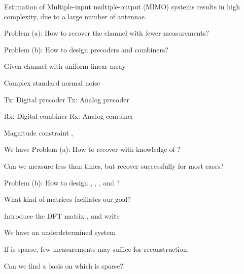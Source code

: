 {
\blank [big]

\I Estimation of Multiple-input multiple-output (MIMO) systems results in high complexity, due to a large number of antennae.

\I Problem (a): How to recover the channel with fewer measurements?

\I Problem (b): How to design precoders and combiners?
}
{
\I Given channel  with uniform linear array

\I Complex standard normal noise 

\I Tx: Digital precoder 
\I Tx: Analog precoder 

\I Rx: Digital combiner 
\I Rx: Analog combiner 

\I Magnitude constraint ,  
}
{
\I We have 
%
\I Problem (a): How to recover  with knowledge of ?

\I Can we measure less than  times, but recover successfully for most cases?

\I Problem (b): How to design , , , and ?

\I What kind of matrices faciliates our goal?
}
{
\I Introduce the DFT matrix , and write

\I We have an underdetermined system 
}
{
\blank [big]

\I If  is sparse, few measurements may suffice for reconstruction.

\I Can we find a basis on which  is sparse?
}
